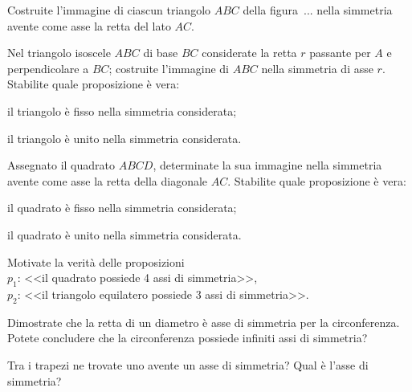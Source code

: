 \begin{esercizio}
\label{ese:8.18}
Costruite l'immagine di ciascun triangolo $ABC$ della figura~... nella simmetria avente come asse la retta del lato $AC$.
\end{esercizio}

\begin{esercizio}
\label{ese:8.19}
Nel triangolo isoscele $ABC$ di base $BC$ considerate la retta $r$ passante per $A$ e perpendicolare a $BC$; costruite l'immagine di $ABC$ nella simmetria di asse $r$. Stabilite quale proposizione è vera:
\begin{enumeratea}
\item il triangolo è fisso nella simmetria considerata;
\item il triangolo è unito nella simmetria considerata.
\end{enumeratea}
\end{esercizio}

\begin{esercizio}
\label{ese:8.20}
Assegnato il quadrato $ABCD$, determinate la sua immagine nella simmetria avente come asse la retta della diagonale $AC$. Stabilite quale proposizione è vera:
\begin{enumeratea}
\item il quadrato è fisso nella simmetria considerata;
\item il quadrato è unito nella simmetria considerata.
\end{enumeratea}
\end{esercizio}

\begin{esercizio}
\label{ese:8.21}
Motivate la verità delle proposizioni\\
$p_1$: <<il quadrato possiede 4 assi di simmetria>>,\\
$p_2$: <<il triangolo equilatero possiede 3 assi di simmetria>>.
\end{esercizio}

\begin{esercizio}
\label{ese:8.22}
Dimostrate che la retta di un diametro è asse di simmetria per la circonferenza. Potete concludere che la circonferenza possiede infiniti assi di simmetria?
\end{esercizio}

\begin{esercizio}
\label{ese:8.23}
Tra i trapezi ne trovate uno avente un asse di simmetria? Qual è l'asse di simmetria? 
\end{esercizio}

